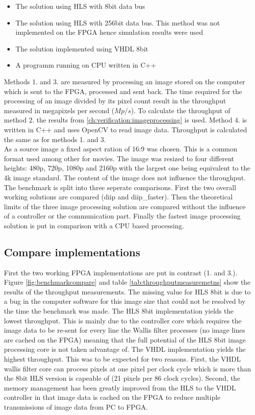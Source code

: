 \begin{itemize}
    \item The solution using HLS with 8bit data bus
    \item The solution using HLS with 256bit data bus. This method was not
    implemented on the FPGA hence simulation results were used
    \item The solution implemented using VHDL 8bit
    \item A programm running on CPU written in C++
\end{itemize}

Methods 1. and 3. are measured by processing an image stored on the computer
which is sent to the FPGA, processed and sent back. The time required for the
processing of an image divided by its pixel count result in the throughput
measured in megapixels per second ($Mp/s$). To calculate the throughput of
method 2. the results from \ref{ch:verification:imageprocessing} is used. Method
4. is written in C++ and uses OpenCV to read image data. Throughput is
calculated the same as for methods 1. and 3.
\\

As a source image a fixed aspect ration of 16:9 was chosen. This is a common
format used among other for movies. The image was resized to four different
heights: 480p, 720p, 1080p and 2160p with the largest one being equivalent to
the
4k image standard. The content of the image does not influence the throughput.
\\

The benchmark is split into three seperate comparisons. First the two overall
working solutions are compared (diip and diip\_faster). Then the theoretical
limits of the three image processing solution are compared without the influence
of a controller or the communication part. Finally the fastest image processing
solution is put in comparison with a CPU based processing.

\subsection{Compare implementations}
First the two working FPGA implementations are put in contrast (1. and 3.).
Figure \ref{fig:benchmarkcompare} and table \ref{tab:throughputmeasuremetns}
show the results of the throughput measurements. The missing value for HLS 8bit
is due to a bug in the computer software for this image size that could not be
resolved by the time the benchmark was made. The HLS 8bit implementation yields
the lowest throughput. This is mainly due to the controller core which requires
the image data to be re-sent for every line the Wallis filter processes 
(no
image lines are cached on the FPGA) meaning
that the full potential of the HLS 8bit image processing core is not taken
advantage of. The VHDL implementation yields the
highest
throughput. This was to be expected for two
reasons. First, the VHDL wallis filter core can process pixels at one pixel per
clock cycle which is more than the 8bit HLS version is capeable of (21 pixels
per 86 clock cycles).
Second, the memory management has been greatly improved from the HLS to the VHDL
controller in that image data is cached on the FPGA to reduce multiple
transmissions of image data from PC to FPGA. 


